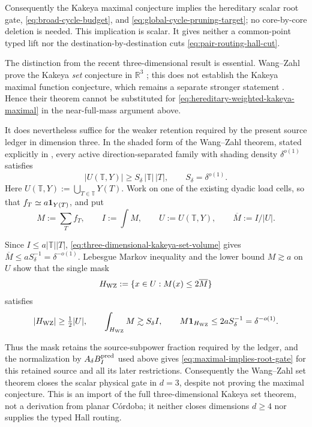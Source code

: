 \documentclass[11pt]{article}
\begin{document}
Consequently the Kakeya maximal conjecture implies the hereditary scalar root
gate, \eqref{eq:broad-cycle-budget}, and
\eqref{eq:global-cycle-pruning-target}; no core-by-core deletion is needed.
This implication is scalar.  It gives neither a common-point typed lift nor
the destination-by-destination cuts \eqref{eq:pair-routing-hall-cut}.

The distinction from the recent three-dimensional result is essential.
Wang--Zahl prove the Kakeya \emph{set} conjecture in \(\mathbb R^3\)
\cite{WangZahl3D}; this does not establish the Kakeya maximal function
conjecture, which remains a separate stronger statement
\cite{ZahlKakeyaSurvey}.  Hence their theorem cannot be substituted for
\eqref{eq:hereditary-weighted-kakeya-maximal} in the near-full-mass argument
above.

It does nevertheless suffice for the weaker retention required by the present
source ledger in dimension three.  In the shaded form of the Wang--Zahl
theorem, stated explicitly in \cite{GuthWangZahl3D}, every active
direction-separated family with shading density \(\delta^{o(1)}\) satisfies
\begin{equation}\label{eq:three-dimensional-kakeya-set-volume}
 \left|U(\mathbb T,Y)\right|
 \ge S_\delta\,|\mathbb T|\,|T|,
 \qquad S_\delta=\delta^{o(1)}.
\end{equation}
Here \(U(\mathbb T,Y):=\bigcup_{T\in\mathbb T}Y(T)\).
Work on one of the existing dyadic load cells, so that
\(f_T\simeq a{\bf1}_{Y(T)}\), and put
\[
 M:=\sum_Tf_T,
 \qquad I:=\int M,
 \qquad U:=U(\mathbb T,Y),
 \qquad \overline M:=I/|U|.
\]

Since \(I\le a|\mathbb T||T|\),
\eqref{eq:three-dimensional-kakeya-set-volume} gives
\(\overline M\le aS_\delta^{-1}=\delta^{-o(1)}\).  Lebesgue Markov inequality
and the lower bound \(M\gtrsim a\) on \(U\) show that the single mask
\begin{equation}\label{eq:wang-zahl-low-multiplicity-mask}
 H_{\rm WZ}:=\{x\in U:M(x)\le2\overline M\}
\end{equation}
satisfies
\begin{equation}\label{eq:wang-zahl-retained-load}
 |H_{\rm WZ}|\ge\tfrac12|U|,
 \qquad
 \int_{H_{\rm WZ}}M
 \gtrsim S_\delta I,
 \qquad
 M{\bf1}_{H_{\rm WZ}}\le2aS_\delta^{-1}=\delta^{-o(1)}.
\end{equation}

Thus the mask retains the source-subpower fraction required by the ledger,
and the normalization by \(A_\delta B_I^{\rm pred}\) used above gives
\eqref{eq:maximal-implies-root-gate} for this retained source and all its later
restrictions.  Consequently the Wang--Zahl set theorem closes the scalar
physical gate in \(d=3\), despite not proving the maximal conjecture.  This is
an import of the full three-dimensional Kakeya set theorem, not a derivation
from planar C\'ordoba; it neither closes dimensions \(d\ge4\) nor supplies the
typed Hall routing.
\end{document}
